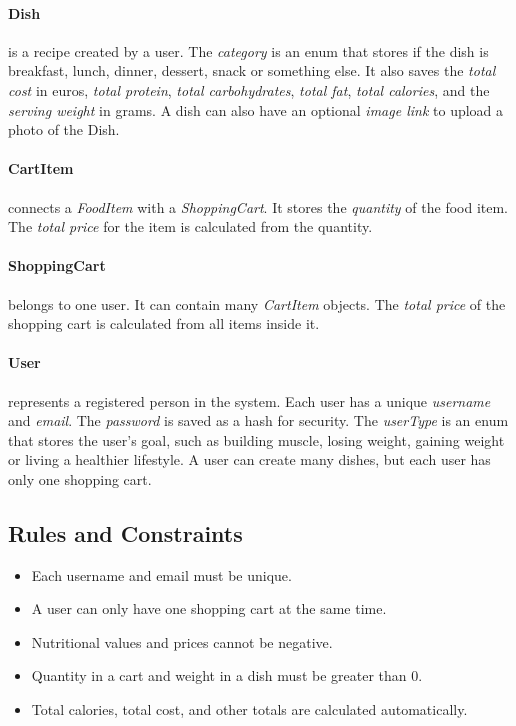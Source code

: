\documentclass[11pt]{article}
\begin{document}
\paragraph{Dish} is a recipe created by a user. 
The \textit{category} is an enum that stores if the dish is breakfast, lunch, dinner, dessert, snack or something else.
It also saves the 
\textit{total cost} in euros, 
\textit{total protein}, 
\textit{total carbohydrates}, 
\textit{total fat}, 
\textit{total calories}, 
and the \textit{serving weight} in grams.
A dish can also have an optional \textit{image link} to upload a photo of the Dish.

\paragraph{CartItem} connects a \textit{FoodItem} with a \textit{ShoppingCart}.
It stores the \textit{quantity} of the food item.
The \textit{total price} for the item is calculated from the quantity.

\paragraph{ShoppingCart} belongs to one user.
It can contain many \textit{CartItem} objects.
The \textit{total price} of the shopping cart is calculated from all items inside it.

\paragraph{User} represents a registered person in the system. 
Each user has a unique \textit{username} and \textit{email}. 
The \textit{password} is saved as a hash for security.
The \textit{userType} is an enum that stores the user's goal, such as building muscle, losing weight, gaining weight or living a healthier lifestyle.
A user can create many dishes, but each user has only one shopping cart.


\subsection*{Rules and Constraints}

\begin{itemize}
    \item Each username and email must be unique.
    \item A user can only have one shopping cart at the same time.
    \item Nutritional values and prices cannot be negative.
    \item Quantity in a cart and weight in a dish must be greater than 0.
    \item Total calories, total cost, and other totals are calculated automatically.
\end{itemize}
\end{document}
